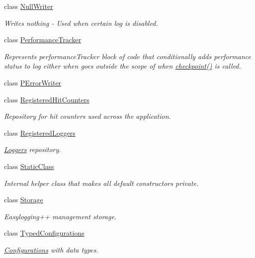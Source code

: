 \begin{DoxyCompactItemize}
class \hyperlink{classel_1_1base_1_1NullWriter}{Null\+Writer}
\begin{DoxyCompactList}\small\item\em Writes nothing -\/ Used when certain log is disabled. \end{DoxyCompactList}\item 
class \hyperlink{classel_1_1base_1_1PerformanceTracker}{Performance\+Tracker}
\begin{DoxyCompactList}\small\item\em Represents performance\+Tracker block of code that conditionally adds performance status to log either when goes outside the scope of when \hyperlink{classel_1_1base_1_1PerformanceTracker_aec9a6e149674c5782cc855e49aeb0aaf}{checkpoint()} is called. \end{DoxyCompactList}\item 
class \hyperlink{classel_1_1base_1_1PErrorWriter}{P\+Error\+Writer}
\item 
class \hyperlink{classel_1_1base_1_1RegisteredHitCounters}{Registered\+Hit\+Counters}
\begin{DoxyCompactList}\small\item\em Repository for hit counters used across the application. \end{DoxyCompactList}\item 
class \hyperlink{classel_1_1base_1_1RegisteredLoggers}{Registered\+Loggers}
\begin{DoxyCompactList}\small\item\em \hyperlink{classel_1_1Loggers}{Loggers} repository. \end{DoxyCompactList}\item 
class \hyperlink{classel_1_1base_1_1StaticClass}{Static\+Class}
\begin{DoxyCompactList}\small\item\em Internal helper class that makes all default constructors private. \end{DoxyCompactList}\item 
class \hyperlink{classel_1_1base_1_1Storage}{Storage}
\begin{DoxyCompactList}\small\item\em Easylogging++ management storage. \end{DoxyCompactList}\item 
class \hyperlink{classel_1_1base_1_1TypedConfigurations}{Typed\+Configurations}
\begin{DoxyCompactList}\small\item\em \hyperlink{classel_1_1Configurations}{Configurations} with data types. \end{DoxyCompactList}\item 

\end{DoxyCompactItemize}
